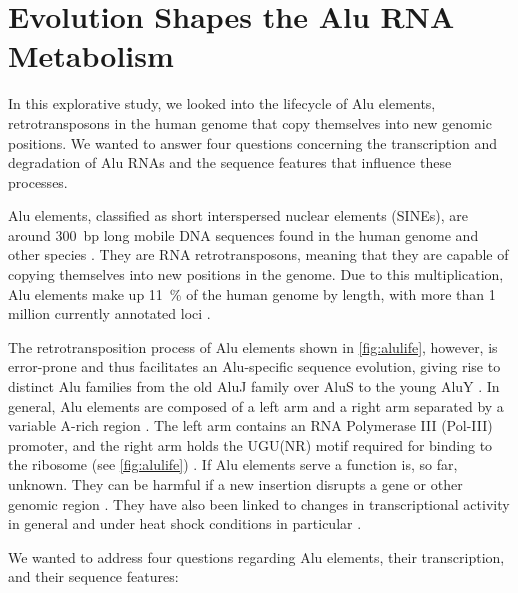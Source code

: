 
\chapter{Evolution Shapes the Alu RNA Metabolism}

In this explorative study, we looked into the lifecycle of Alu elements,
retrotransposons in the human genome that copy themselves into new genomic
positions. We wanted to answer four questions concerning the transcription
and degradation of Alu RNAs and the sequence features that influence these
processes.

Alu elements, classified as short interspersed nuclear elements (SINEs), are
around \num{300}~bp long mobile DNA sequences found in the human genome and
other species \citep{Quentin1992,Lander2001,JO2007,Deininger2011}. They are
RNA retrotransposons, meaning that they are capable of copying themselves into
new positions in the genome. Due to this multiplication, Alu elements make up
\SI{11}{\percent} of the human genome by length, with more than \num{1}
million currently annotated loci \citep{Lander2001}.

The retrotransposition process of Alu elements shown in \cref{fig:alulife},
however, is error-prone and thus facilitates an Alu-specific sequence
evolution, giving rise to distinct Alu families from the old AluJ family over
AluS to the young AluY \citep{MR1991,Deininger1999,Batzer1996}. In general,
Alu elements are composed of a left arm and a right arm separated by a
variable A-rich region \citep{Evgenev2007}. The left arm contains an RNA
Polymerase III (Pol-III) promoter\label{sen:alupromo}, and the right arm holds
the UGU(NR) motif required for binding to the ribosome (see \cref{fig:alulife})
\citep{ Paolella1983,Dagan2004,A2012}. If Alu elements serve a function is,
so far, unknown. They can be harmful if a new insertion disrupts a gene or
other genomic region \citep{Deininger1999}. They have also been linked to
changes in transcriptional activity in general and under heat shock conditions
in particular \citep{Mariner2008,LL2017,Zhang2019}.

We wanted to address four questions regarding Alu elements, their
transcription, and their sequence features:


